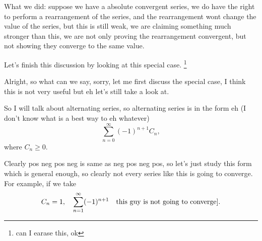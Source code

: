 \documentclass[11pt, sakura, night, 1in]{hw}
\begin{document}

What we did: suppose we have a absolute convergent series, we do have the right to perform a rearrangement of the series, and the rearrangement wont change the value of the series, but this is still weak, we are claiming something much stronger than this, we are not only proving the rearrangement convergent, but not showing they converge to the same value.

Let's finish this discussion by looking at this special case. \footnote{can I earase this, ok}

Alright, so what can we say, sorry, let me first discuss the special case, I think this is not very useful but eh let's still take a look at.

So I will talk about alternating series, so alternating  series is in the form eh (I don't know what is a best way to eh whatever)\[\sum_{n=0}^\infty (-1)^{n+1} C_n,\] where $C_n\ge 0$. 

Clearly pos neg pos neg is same as neg pos neg pos, so let's just study this form which is general enough, so clearly not every series like this is going to converge. For example, if we take \[C_n=1, \quad \sum_{n=1}^\infty (-1)^{n+1}\quad\text{this guy is not going to converge}].\]
\end{document}
